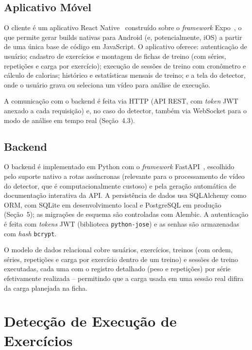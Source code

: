 \documentclass[12pt]{article}
\begin{document}
\subsection{Aplicativo Móvel}

O cliente é um aplicativo React Native~\cite{reactnative} construído sobre
o \textit{framework} Expo~\cite{expo}, o que permite gerar builds nativas
para Android (e, potencialmente, iOS) a partir de uma única base de código
em JavaScript. O aplicativo oferece: autenticação de usuário; cadastro de
exercícios e montagem de fichas de treino (com séries, repetições e carga
por exercício); execução de sessões de treino com cronômetro e cálculo de
calorias; histórico e estatísticas mensais de treino; e a tela do detector,
onde o usuário grava ou seleciona um vídeo para análise de execução.

A comunicação com o backend é feita via HTTP (API REST, com
\textit{token} JWT anexado a cada requisição) e, no caso do detector,
também via WebSocket para o modo de análise em tempo real (Seção~4.3).

\subsection{Backend}

O backend é implementado em Python com o \textit{framework}
FastAPI~\cite{fastapi}, escolhido pelo suporte nativo a rotas assíncronas
(relevante para o processamento de vídeo do detector, que é
computacionalmente custoso) e pela geração automática de documentação
interativa da API. A persistência de dados usa SQLAlchemy como ORM, com
SQLite em desenvolvimento local e PostgreSQL em produção (Seção~5); as
migrações de esquema são controladas com Alembic. A autenticação é feita
com \textit{tokens} JWT (biblioteca \texttt{python-jose}) e as senhas são
armazenadas com \textit{hash} \texttt{bcrypt}.

O modelo de dados relacional cobre usuários, exercícios, treinos (com
ordem, séries, repetições e carga por exercício dentro de um treino) e
sessões de treino executadas, cada uma com o registro detalhado (peso e
repetições) por série efetivamente realizada -- permitindo que a carga
usada em uma sessão real difira da carga planejada na ficha.

\section{Detecção de Execução de Exercícios}
\end{document}
